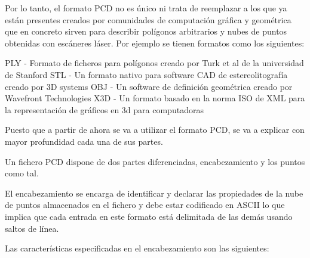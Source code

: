 Por lo tanto, el formato PCD no es único ni trata de reemplazar a los que ya están presentes creados por comunidades de computación gráfica y geométrica que en concreto sirven para describir polígonos arbitrarios y nubes de puntos obtenidas con escáneres láser. Por ejemplo se tienen formatos como los siguientes:


PLY - Formato de ficheros para polígonos creado por Turk et al de la universidad de Stanford
STL - Un formato nativo para software CAD de estereolitografía creado por 3D systems 
OBJ - Un software de definición geométrica creado por Wavefront Technologies 
X3D - Un formato basado en la norma ISO de XML para la representación de gráficos en 3d para computadoras 

Puesto que a partir de ahora se va a utilizar el formato PCD, se va a explicar con mayor profundidad cada una de sus partes.

Un fichero PCD dispone de dos partes diferenciadas, encabezamiento y los puntos como tal.

El encabezamiento se encarga de identificar y declarar las propiedades de la nube de puntos almacenados en el fichero y debe estar codificado en ASCII lo que implica que cada entrada en este formato está delimitada de las demás usando saltos de línea.

Las características especificadas en el encabezamiento son las siguientes:

